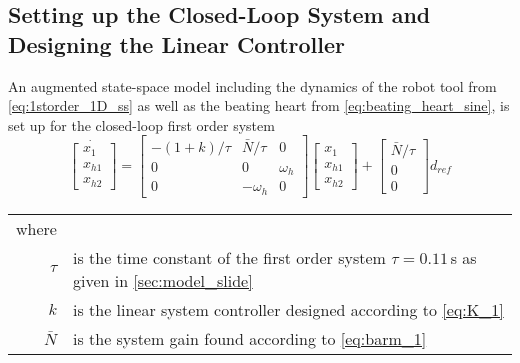 \subsection{Setting up the Closed-Loop System and Designing the Linear Controller}
An augmented state-space model including the dynamics of the robot tool from \autoref{eq:1storder_1D_ss} as well as the beating heart from \autoref{eq:beating_heart_sine}, is set up for the closed-loop first order system
\begin{equation}
\dot{\begin{bmatrix}
	x_1\\x_{h1}\\x_{h2}
	\end{bmatrix}} =
\begin{bmatrix}
-(1+k)/\tau & \bar{N}/\tau & 0\\0 & 0 & \omega_h \\ 0 & -\omega_h & 0
\end{bmatrix}
\begin{bmatrix}
x_1\\x_{h1}\\x_{h2}
\end{bmatrix}+ 
\begin{bmatrix}
\bar{N}/\tau \\ 0 \\ 0
\end{bmatrix}
d_{ref}
\end{equation}
\begin{tabular}{rl}
where &\\
$\tau$ & is the time constant of the first order system $\tau=0.11$\,s as given in \autoref{sec:model_slide}\\
$k$ & is the linear system controller designed according to \autoref{eq:K_1}\\
$\bar{N}$ & is the system gain found according to \autoref{eq:barm_1}
\end{tabular}\\

